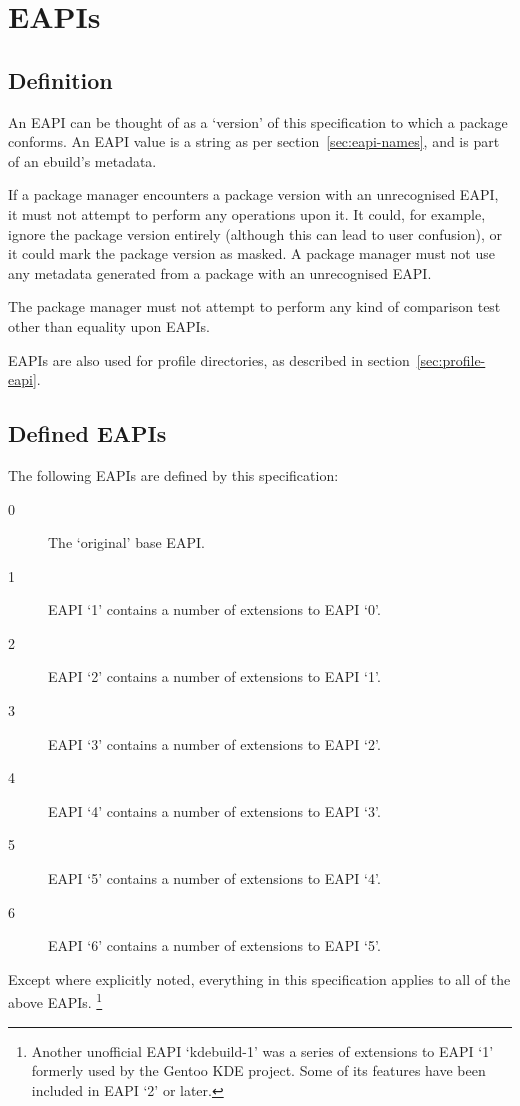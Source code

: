 \chapter{EAPIs}

\section{Definition}

An EAPI can be thought of as a `version' of this specification to which a package conforms. An EAPI
value is a string as per section~\ref{sec:eapi-names}, and is part of an ebuild's metadata.

If a package manager encounters a package version with an unrecognised EAPI, it must not attempt to
perform any operations upon it. It could, for example, ignore the package version entirely (although
this can lead to user confusion), or it could mark the package version as masked. A package manager
must not use any metadata generated from a package with an unrecognised EAPI.

The package manager must not attempt to perform any kind of comparison test other than equality upon
EAPIs.

EAPIs are also used for profile directories, as described in section~\ref{sec:profile-eapi}.

\section{Defined EAPIs}

The following EAPIs are defined by this specification:

\begin{description}
\item[0] The `original' base EAPI.
\item[1] EAPI `1' contains a number of extensions to EAPI `0'.
\item[2] EAPI `2' contains a number of extensions to EAPI `1'.
\item[3] EAPI `3' contains a number of extensions to EAPI `2'.
\item[4] EAPI `4' contains a number of extensions to EAPI `3'.
\item[5] EAPI `5' contains a number of extensions to EAPI `4'.
\item[6] EAPI `6' contains a number of extensions to EAPI `5'.
\end{description}

Except where explicitly noted, everything in this specification
applies to all of the above EAPIs.%
\footnote{Another unofficial EAPI `kdebuild-1' was a series of
    extensions to EAPI `1' formerly used by the Gentoo KDE project.
    Some of its features have been included in EAPI `2' or later.}

